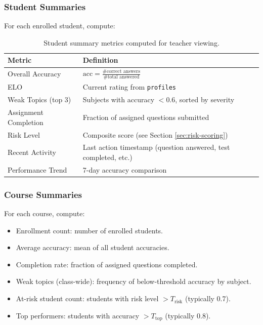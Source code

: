 \documentclass[sigconf,authordraft,twoside]{acmart}
\newcommand{\tech}[1]{\textcolor{brandblue}{\nolinkurl{#1}}}
\begin{document}
\subsubsection{Student Summaries}

For each enrolled student, compute:

\begin{table}[t]
\centering
\small
\begin{tabularx}{\columnwidth}{>{\raggedright\arraybackslash}p{} X}
\toprule
\textbf{Metric} & \textbf{Definition} \\
\midrule
Overall Accuracy & $\text{acc} = \frac{\text{\# correct answers}}{\text{\# total answered}}$ \\
ELO & Current rating from \tech{profiles} \\
Weak Topics (top 3) & Subjects with accuracy $< 0.6$, sorted by severity \\
Assignment Completion & Fraction of assigned questions submitted \\
Risk Level & Composite score (see Section \ref{sec:risk-scoring}) \\
Recent Activity & Last action timestamp (question answered, test completed, etc.) \\
Performance Trend & 7-day accuracy comparison \\
\bottomrule
\end{tabularx}
\caption{Student summary metrics computed for teacher viewing.}
\end{table}

\subsubsection{Course Summaries}

For each course, compute:

\begin{itemize}
\item Enrollment count: number of enrolled students.
\item Average accuracy: mean of all student accuracies.
\item Completion rate: fraction of assigned questions completed.
\item Weak topics (class-wide): frequency of below-threshold accuracy by subject.
\item At-risk student count: students with risk level $> T_{\text{risk}}$ (typically 0.7).
\item Top performers: students with accuracy $> T_{\text{top}}$ (typically 0.8).
\end{itemize}
\end{document}
